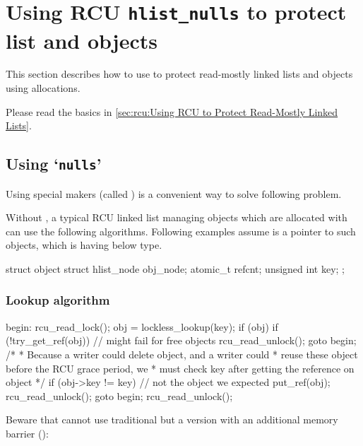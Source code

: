 
\section{Using RCU \texttt{hlist\_nulls} to protect list and objects}
\label{sec:rcu:Using RCU hlist_nulls to protect list and objects}

This section describes how to use  to
protect read-mostly linked lists and
objects using  allocations.

Please read the basics in \cref{sec:rcu:Using RCU to Protect Read-Mostly Linked Lists}.

\subsection{Using `\texttt{nulls}'}
\label{sec:rcu:Using nulls}

Using special makers (called ) is a convenient way
to solve following problem.

Without , a typical RCU linked list managing objects which are
allocated with   can use the following
algorithms.
Following examples assume  is a pointer to such
objects, which is having below type.

\begin{VerbatimU}
	struct object {
		struct hlist_node obj_node;
		atomic_t refcnt;
		unsigned int key;
	};
\end{VerbatimU}

\subsubsection{Lookup algorithm}

\begin{VerbatimU}
	begin:
	rcu_read_lock();
	obj = lockless_lookup(key);
	if (obj) {
		if (!try_get_ref(obj)) { // might fail for free objects
			rcu_read_unlock();
			goto begin;
		}
		/*
		 * Because a writer could delete object, and a writer could
		 * reuse these object before the RCU grace period, we
		 * must check key after getting the reference on object
		 */
		if (obj->key != key) { // not the object we expected
			put_ref(obj);
			rcu_read_unlock();
			goto begin;
		}
	}
	rcu_read_unlock();
\end{VerbatimU}

Beware that  cannot use traditional 
but a version with an additional memory barrier ():

